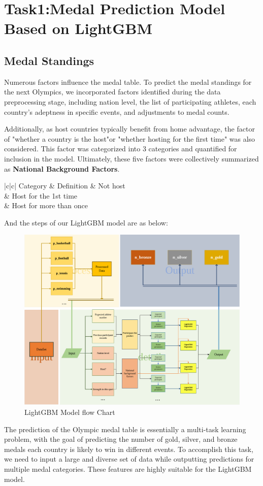 \documentclass[12pt]{article}  %
\begin{document}
\section{Task1:Medal Prediction Model Based on LightGBM}
\subsection{Medal Standings}
Numerous factors influence the medal table. To predict the medal standings for the next Olympics, we incorporated factors identified during the data preprocessing stage, including nation level, the list of participating athletes, each country's adeptness in specific events, and adjustments to medal counts.

Additionally, as host countries typically benefit from home advantage, the factor of "whether a country is the host"or "whether hosting for the first time" was also considered. This factor was categorized into 3 categories and quantified for inclusion in the model. Ultimately, these five factors were collectively summarized as \textbf{National Background Factors}.



\begin{longtable}{|c|c|} 
	\hline
	Category & Definition               \endfirsthead 
	        & Not host                 \\ 
	        & Host for the 1st time    \\ 
	        & Host for more than once  \\
	\hline
\end{longtable}


And the steps of our LightGBM model are as below:
\begin{figure}[H]
	\centering
	\includegraphics[width=12cm]{img/xiao.png}
	\caption{LightGBM Model flow Chart}
	\label{fig:aa}
\end{figure}
The prediction of the Olympic medal table is essentially a multi-task learning problem, with the goal of predicting the number of gold, silver, and bronze medals each country is likely to win in different events. To accomplish this task, we need to input a large and diverse set of data while outputting predictions for multiple medal categories. These features are highly suitable for the LightGBM model.
\end{document}
